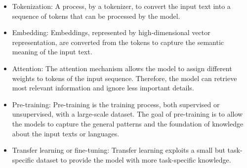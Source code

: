 \begin{itemize}
    \item Tokenization: A process, by a tokenizer, to convert the input text into a sequence of tokens that can be processed by the model.
    \item Embedding: Embeddings, represented by high-dimensional vector representation, are converted from the tokens to capture the semantic meaning of the input text.  
    \item Attention: The attention mechanism allows the model to assign different weights to tokens of the input sequence.  Therefore, the model can retrieve most relevant information and ignore less important details.
    \item Pre-training: Pre-training is the training process, both supervised or unsupervised, with a large-scale dataset. The goal of pre-training is to allow the models to capture the general patterns and the foundation of knowledge about the input texts or languages. 
    \item Transfer learning or fine-tuning: Transfer learning exploits a small but task-specific dataset to provide the model with more task-specific knowledge.
\end{itemize}


